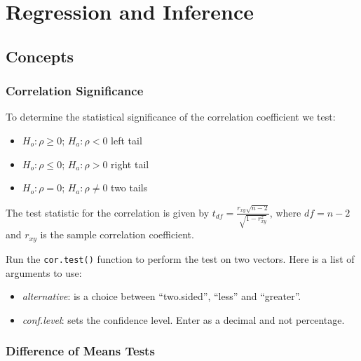\documentclass[
  letterpaper,
  DIV=11,
  numbers=noendperiod]{scrreprt}
\begin{document}
\hypertarget{regression-and-inference}{%
\chapter{Regression and Inference}\label{regression-and-inference}}

\hypertarget{concepts-13}{%
\section{Concepts}\label{concepts-13}}

\hypertarget{correlation-significance}{%
\subsection*{Correlation Significance}\label{correlation-significance}}

To determine the statistical significance of the correlation coefficient
we test:

\begin{itemize}
\item
  \(H_o: \rho \geq 0\); \(H_a: \rho <0\) left tail
\item
  \(H_o: \rho \leq 0\); \(H_a: \rho >0\) right tail
\item
  \(H_o: \rho = 0\); \(H_a: \rho \neq 0\) two tails
\end{itemize}

The test statistic for the correlation is given by
\(t_{df}= \frac{r_{xy}\sqrt{n-2}}{\sqrt{1-r_{xy}^2}}\), where \(df=n-2\)
and \(r_{xy}\) is the sample correlation coefficient.

Run the \texttt{cor.test()} function to perform the test on two vectors.
Here is a list of arguments to use:

\begin{itemize}
\item
  \emph{alternative}: is a choice between ``two.sided'', ``less'' and
  ``greater''.
\item
  \emph{conf.level}: sets the confidence level. Enter as a decimal and
  not percentage.
\end{itemize}

\hypertarget{difference-of-means-tests}{%
\subsection*{Difference of Means
Tests}\label{difference-of-means-tests}}
\end{document}

